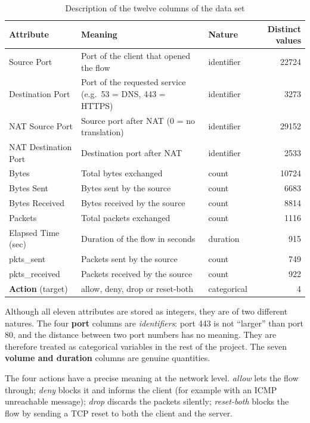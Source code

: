 \begin{table}[htbp]
  \centering
  \caption{Description of the twelve columns of the data set}
  \label{tab:attributs}
  \small
  \begin{tabular}{|l|p{5.6cm}|l|r|}
    \hline
    \textbf{Attribute} & \textbf{Meaning} & \textbf{Nature} & \textbf{Distinct values} \\
    \hline
    Source Port & Port of the client that opened the flow & identifier & \num{22724} \\
    Destination Port & Port of the requested service (e.g.\ 53 = DNS, 443 = HTTPS) & identifier & \num{3273} \\
    NAT Source Port & Source port after \ac{NAT} (0 = no translation) & identifier & \num{29152} \\
    NAT Destination Port & Destination port after \ac{NAT} & identifier & \num{2533} \\
    Bytes & Total bytes exchanged & count & \num{10724} \\
    Bytes Sent & Bytes sent by the source & count & \num{6683} \\
    Bytes Received & Bytes received by the source & count & \num{8814} \\
    Packets & Total packets exchanged & count & \num{1116} \\
    Elapsed Time (sec) & Duration of the flow in seconds & duration & 915 \\
    pkts\_sent & Packets sent by the source & count & 749 \\
    pkts\_received & Packets received by the source & count & 922 \\
    \hline
    \textbf{Action} (target) & allow, deny, drop or reset-both & categorical & 4 \\
    \hline
  \end{tabular}
\end{table}

Although all eleven attributes are stored as integers, they are of two different natures. The four \textbf{port} columns are \emph{identifiers}: port 443 is not ``larger'' than port 80, and the distance between two port numbers has no meaning. They are therefore treated as categorical variables in the rest of the project. The seven \textbf{volume and duration} columns are genuine quantities.

The four actions have a precise meaning at the network level. \emph{allow} lets the flow through; \emph{deny} blocks it and informs the client (for example with an ICMP unreachable message); \emph{drop} discards the packets silently; \emph{reset-both} blocks the flow by sending a TCP reset to both the client and the server.

